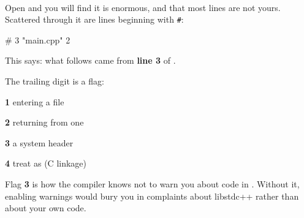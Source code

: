 \documentclass[
    10pt,
    dvipsnames,
    svgnames,
    x11names,
    aspectratio=1610,
    english,
    codeminted]{beamer}
\begin{document}
\begin{frame}[fragile]{\secname}
\framesubtitle{\subsecname}
Open  and you will find it is enormous, and that most lines are not yours. Scattered through it are lines beginning with \texttt{#}:

\begin{bashcodebasic}[][fontsize=\footnotesize]
# 3 "main.cpp" 2
\end{bashcodebasic}

\begin{compactitem}
\small
    \item This says: what follows came from \textbf{line 3} of .
    \item The trailing digit is a flag: 
    \begin{compactitem}
        \item \textbf{1} entering a file
        \item \textbf{2} returning from one
        \item \textbf{3} a system header
        \item \textbf{4} treat as  (C linkage)
    \end{compactitem}
        \item Flag \textbf{3} is how the compiler knows not to warn you about code in . Without it, enabling warnings would bury you in complaints about libstdc++ rather than about your own code.
\end{compactitem}


\end{frame}
\end{document}
